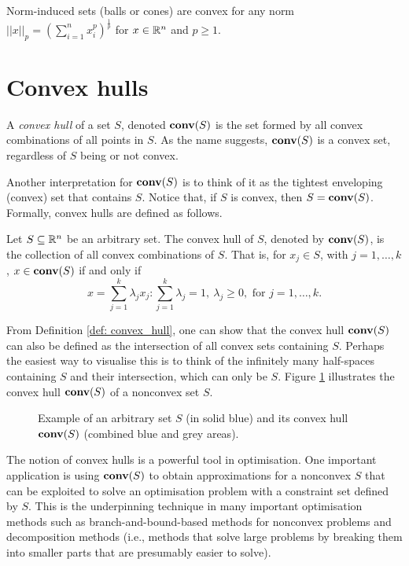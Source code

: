 \begin{remark} 
	Norm-induced sets (balls or cones) are convex for any norm $||x||_p = \left(\sum_{i=1}^n x_i^p\right)^{\frac{1}{p}}$ for $x \in \mathbb{R}^n$ and $p \geq 1$.
\end{remark}


\section{Convex hulls} 

A \emph{convex hull} of a set $S$, denoted $\mathop{\bf conv}(S)$ is the set formed by all convex combinations of all points in $S$. As the name suggests, $\mathop{\bf conv}(S)$ is a convex set, regardless of $S$ being or not convex. 

Another interpretation for $\mathop{\bf conv}(S)$ is to think of it as the tightest enveloping (convex) set that contains $S$. Notice that, if $S$ is convex, then $S = \mathop{\bf conv}(S)$.  Formally, convex hulls are defined as follows.

\begin{definition}\label{def: convex_hull}
	Let $S \subseteq \mathbb{R}^n$ be an arbitrary set. The convex hull of $S$, denoted by $\mathop{\bf conv}(S)$, is the collection of all convex combinations of $S$. That is, for $x_j \in S$, with $j = 1,\dots, k$, $x \in \mathop{\bf conv}(S)$ if and only if 
	\begin{equation*}
		x = \sum_{j=1}^k \lambda_jx_j : \sum_{j=1}^k \lambda_j = 1, \ \lambda_j \geq 0, \text{ for } j = 1,\dots,k.
	\end{equation*}                       
\end{definition}
%

From Definition \ref{def: convex_hull}, one can show that the convex hull $\mathop{\bf conv}(S)$ can also be defined as the intersection of all convex sets containing $S$. Perhaps the easiest way to visualise this is to think of the infinitely many half-spaces containing $S$ and their intersection, which can only be $S$. Figure \ref{fig:convex_hull} illustrates the convex hull $\mathop{\bf conv}(S)$ of a nonconvex set $S$.
%
\begin{figure}[H]
\caption{Example of an arbitrary set $S$ (in solid blue) and its convex hull $\mathop{\bf conv}(S)$ (combined blue and grey areas).} \label{fig:convex_hull}
\end{figure}
%
The notion of convex hulls is a powerful tool in optimisation. One important application is using $\mathop{\bf conv}(S)$ to obtain approximations for a nonconvex $S$ that can be exploited to solve an optimisation problem with a constraint set defined by $S$. This is the underpinning technique in many important optimisation methods such as branch-and-bound-based methods for nonconvex problems and decomposition methods (i.e., methods that solve large problems by breaking them into smaller parts that are presumably easier to solve).  

